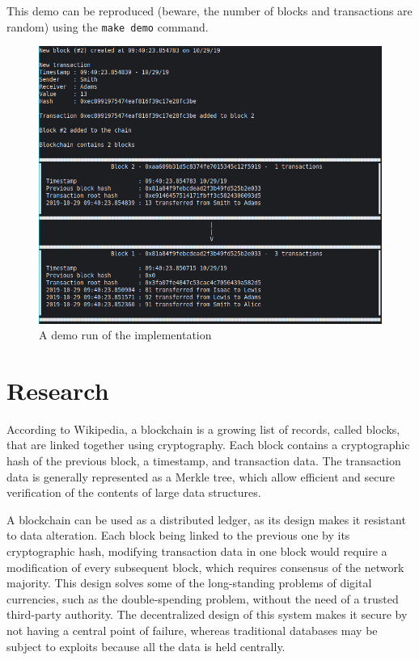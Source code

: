 \documentclass{article}
\begin{document}
This demo can be reproduced (beware, the number of blocks and transactions are random) using the \verb+make demo+ command.

\begin{figure}[h!]
    \begin{center}
        \includegraphics[width=0.7\linewidth]{demo.png}
        \caption{A demo run of the implementation}
        \label{fig:demo}
    \end{center}
\end{figure}


\section{Research}\label{Research}

According to Wikipedia\cite{wiki:blockchain}, a blockchain is a growing list of records, called blocks, that are linked together using cryptography. Each block contains a cryptographic hash of the previous block, a timestamp, and transaction data. The transaction data is generally represented as a Merkle tree, which allow efficient and secure verification of the contents of large data structures.

\bigskip

A blockchain can be used as a distributed ledger, as its design makes it resistant to data alteration. Each block being linked to the previous one by its cryptographic hash, modifying transaction data in one block would require a modification of every subsequent block, which requires consensus of the network majority. This design solves some of the long-standing problems of digital currencies, such as the double-spending problem, without the need of a trusted third-party authority. The decentralized design of this system makes it secure by not having a central point of failure, whereas traditional databases may be subject to exploits because all the data is held centrally.
\end{document}

